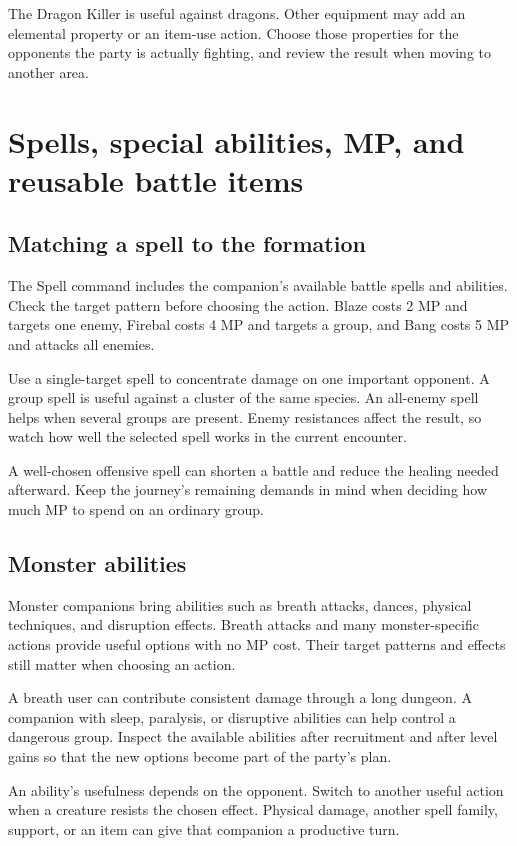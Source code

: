 The Dragon Killer is useful against dragons. Other equipment may add an
elemental property or an item-use action. Choose those properties for
the opponents the party is actually fighting, and review the result when
moving to another area.

\section{Spells, special abilities, MP, and reusable battle items}

\subsection*{Matching a spell to the formation}

The Spell command includes the companion's available battle spells and
abilities. Check the target pattern before choosing the action. Blaze
costs 2 MP and targets one enemy, Firebal costs 4 MP and targets a group,
and Bang costs 5 MP and attacks all enemies.

Use a single-target spell to concentrate damage on one important opponent.
A group spell is useful against a cluster of the same species. An all-enemy
spell helps when several groups are present. Enemy resistances affect the
result, so watch how well the selected spell works in the current encounter.

A well-chosen offensive spell can shorten a battle and reduce the healing
needed afterward. Keep the journey's remaining demands in mind when
deciding how much MP to spend on an ordinary group.

\subsection*{Monster abilities}

Monster companions bring abilities such as breath attacks, dances,
physical techniques, and disruption effects. Breath attacks and many
monster-specific actions provide useful options with no MP cost.
Their target patterns and effects still matter when choosing an action.

A breath user can contribute consistent damage through a long dungeon.
A companion with sleep, paralysis, or disruptive abilities can help control
a dangerous group. Inspect the available abilities after recruitment and
after level gains so that the new options become part of the party's plan.

An ability's usefulness depends on the opponent. Switch to another useful
action when a creature resists the chosen effect. Physical damage, another
spell family, support, or an item can give that companion a productive turn.

